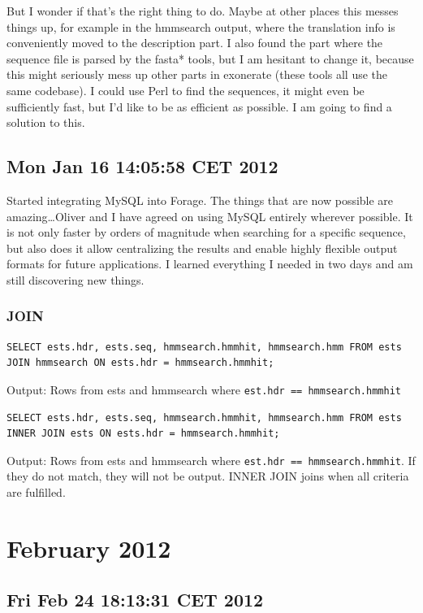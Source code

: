 But I wonder if that's the right thing to do. Maybe at other places this messes
things up, for example in the hmmsearch output, where the translation info is
conveniently moved to the description part. I also found the part where the
sequence file is parsed by the fasta* tools, but I am hesitant to change it,
because this might seriously mess up other parts in exonerate (these tools all
use the same codebase). I could use Perl to find the sequences, it might even be
sufficiently fast, but I'd like to be as efficient as possible. I am going to
find a solution to this. 

\subsection*{Mon Jan 16 14:05:58 CET 2012}

Started integrating MySQL into Forage. The things that are now possible are
amazing\ldots Oliver and I have agreed on using MySQL entirely wherever
possible. It is not only faster by orders of magnitude when searching for a
specific sequence, but also does it allow centralizing the results and enable
highly flexible output formats for future applications. I learned everything I
needed in two days and am still discovering new things.

\subsubsection*{JOIN}

\lstset{language=SQL}
\begin{lstlisting}
SELECT ests.hdr, ests.seq, hmmsearch.hmmhit, hmmsearch.hmm FROM ests JOIN hmmsearch ON ests.hdr = hmmsearch.hmmhit;
\end{lstlisting}
Output: Rows from ests and hmmsearch where \lstinline{est.hdr == hmmsearch.hmmhit}

\begin{lstlisting}
SELECT ests.hdr, ests.seq, hmmsearch.hmmhit, hmmsearch.hmm FROM ests INNER JOIN ests ON ests.hdr = hmmsearch.hmmhit;
\end{lstlisting}
Output: Rows from ests and hmmsearch where \lstinline{est.hdr == hmmsearch.hmmhit}. 
If they do not match, they will not be output. INNER JOIN joins when all
criteria are fulfilled.


\section{February 2012}
\subsection*{Fri Feb 24 18:13:31 CET 2012}


